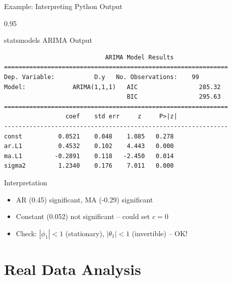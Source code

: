 \documentclass[9pt, aspectratio=169, t]{beamer}
\begin{document}
\begin{frame}[fragile]{Example: Interpreting Python Output}
    \begin{cminipage}{0.95\textwidth}
    \vspace{-0.3cm}
    \begin{block}{statsmodels ARIMA Output}
        \scriptsize
        \begin{verbatim}
                            ARIMA Model Results
==============================================================
Dep. Variable:           D.y   No. Observations:    99
Model:             ARIMA(1,1,1)   AIC                 285.32
                                  BIC                 295.63
==============================================================
                 coef    std err     z     P>|z|
--------------------------------------------------------------
const          0.0521    0.048    1.085   0.278
ar.L1          0.4532    0.102    4.443   0.000
ma.L1         -0.2891    0.118   -2.450   0.014
sigma2         1.2340    0.176    7.011   0.000
        \end{verbatim}
    \end{block}

    \begin{block}{Interpretation}
        {\small
        \begin{itemize}\setlength{\itemsep}{0pt}
            \item AR (0.45) significant, MA (-0.29) significant
            \item Constant (0.052) not significant -- could set $c=0$
            \item Check: $|\phi_1| < 1$ (stationary), $|\theta_1| < 1$ (invertible) -- OK!
        \end{itemize}
        }
    \end{block}
    \end{cminipage}
\end{frame}

\section{Real Data Analysis}
\end{document}

